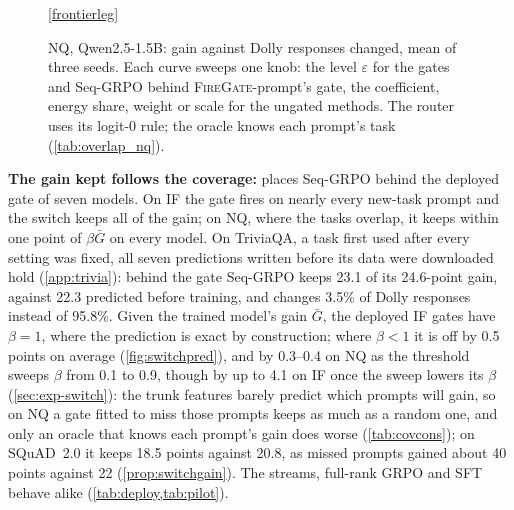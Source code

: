 \documentclass{article}
\theoremstyle{plain}
\theoremstyle{definition}
\theoremstyle{remark}
\newcommand{\methodp}{\textsc{FireGate}-prompt}
\newcommand{\resdir}{latex_v2_results}%
\newcommand{\Odir}{\resdir/v2_overlap_q15/results}
\newcommand{\placeholder}[1]{\begin{center}\fbox{\parbox[c][1.6cm][c]{0.9\linewidth}{\centering\small
  \textcolor{blue!60!black}{#1}}}\end{center}}
\begin{document}
\begin{figure}[t]
{\par\vspace{-1pt}\ref*{frontierleg}
}{\placeholder{Trade-off figure.}}
\caption{NQ, Qwen2.5-1.5B: gain against Dolly responses changed, mean of three seeds. Each curve sweeps one knob:
the level $\varepsilon$ for the gates and Seq-GRPO behind \methodp{}'s gate, the coefficient, energy share, weight or
scale for the ungated methods. The router uses its logit-0 rule; the oracle knows each prompt's task
(\cref{tab:overlap_nq}).}
\label{fig:frontier}
\end{figure}

\textbf{The gain kept follows the coverage:}  places Seq-GRPO behind the deployed gate of seven models.
On IF the gate fires on nearly every new-task prompt and the switch keeps all of the gain; on NQ, where the tasks
overlap, it keeps within one point of $\beta\bar G$ on every model. On TriviaQA, a task first used after every setting was fixed, all seven predictions written before its data were downloaded hold (\cref{app:trivia}): behind the gate Seq-GRPO keeps 23.1 of its 24.6-point gain, against 22.3 predicted before training, and changes 3.5\% of Dolly responses instead of 95.8\%. Given the trained model's gain $\bar G$, the deployed IF gates have $\beta=1$, where the prediction is exact by
construction; where $\beta<1$ it is off by 0.5 points on average
(\cref{fig:switchpred}), and by 0.3--0.4 on NQ as the threshold sweeps $\beta$ from 0.1 to 0.9, though by up to 4.1
on IF once the sweep lowers its $\beta$ (\cref{sec:exp-switch}): the trunk features barely
predict which prompts will gain, so on NQ a gate fitted to miss those prompts keeps as much as a random one, and only an
oracle that knows each prompt's gain does worse (\cref{tab:covcons});
on SQuAD~2.0 it keeps 18.5 points against 20.8, as missed prompts gained about 40 points against 22
(\cref{prop:switchgain}). The streams, full-rank GRPO and SFT behave alike (\cref{tab:deploy,tab:pilot}).
\end{document}
